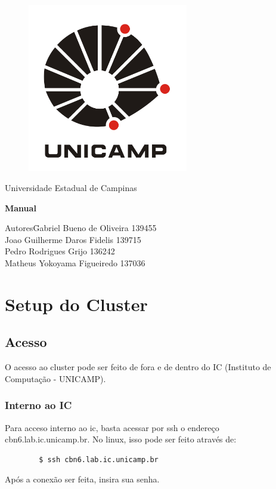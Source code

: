 \documentclass[a4paper,10pt]{article}
\date{\today}
\begin{document}
	\begin{titlepage}
		\begin{figure}
			\centering
			\includegraphics[width=7cm,keepaspectratio=true]{imagens/unicamp.png}
	
		\end{figure}
		\begin{center}
			\huge{Universidade Estadual de Campinas}
		
		\vfill
		\textbf{\LARGE{Manual}}
		\vfill
		\end{center}
		
		\begin{flushleft}
			\begin{tabbing}
				Autores\qquad\qquad\= Gabriel Bueno de Oliveira 139455 \\
					\>Joao Guilherme Daros Fidelis 139715 \\
					\>Pedro Rodrigues Grijo 136242\\
					\>Matheus Yokoyama Figueiredo 137036\\
			\end{tabbing}
		\end{flushleft}
	\end{titlepage}

\newpage
\section{Setup do Cluster}
    \subsection{Acesso}
    O acesso ao cluster pode ser feito de fora e de dentro do IC (Instituto de Computação - UNICAMP).
        \subsubsection{Interno ao IC}
        Para acceso interno ao ic, basta acessar por ssh o endereço cbn6.lab.ic.unicamp.br. No linux, isso pode ser feito através de:
        \begin{verbatim}
        $ ssh cbn6.lab.ic.unicamp.br
        \end{verbatim}
        Após a conexão ser feita, insira sua senha.
\end{document}
